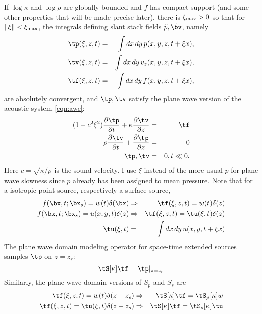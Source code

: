 If $\log \kappa$ and $\log \rho$ are globally bounded and $f$ has
compact support (and some other properties that will be made precise
later), there is $\xi_{\rm max} > 0$ so that for
$\|\xi\|<\xi_{\rm max}$, the integrals defining slant stack fields
$\tilde{p},\tilde{\bv}$, namely
\begin{eqnarray}
\label{eqn:slant}
\tp(\xi,z,t)& = &\int dx\, dy\, p(x,y,z,t+\xi x),\nonumber\\
\tv(\xi,z,t)&=&\int dx\, dy\, v_z(x,y,z,t+\xi x),\nonumber\\
\tf(\xi,z,t)&=&\int dx\,dy\, f(x,y,z,t+\xi x),
\end{eqnarray}
are absolutely convergent, and $\tp, \tv$ satisfy the plane wave
version of the acoustic system \ref{eqn:awe}:
\begin{eqnarray}
\label{eqn:awepw}
(1-c^2\xi^2)\frac{\partial \tp}{\partial t} + \kappa\frac{\partial
  \tv}{\partial z} &=& \tf \nonumber\\
\rho \frac{\partial \tv}{\partial t} + \frac{\partial \tp}{\partial
  z}&=&0\nonumber\\
\tp,\tv&=&0, t \ll 0.
\end{eqnarray}
Here $c=\sqrt{\kappa/\rho}$ is the sound velocity. I use $\xi$ instead
of the more usual $p$ for plane wave slowness since $p$ already has
been assigned to mean pressure. Note that for a isotropic point
source, respectively a surface source,
\begin{eqnarray}
  f(\bx,t;\bx_s)=w(t)\delta(\bx) & \Rightarrow &
                                               \tf(\xi,z,t)=w(t)\delta(z)\\ \nonumber 
  f(\bx,t;\bx_s) = u(x,y,t)\delta(z) & \Rightarrow &
                                                     \tf(\xi,z,t) =
                                                     \tu(\xi,t)\delta(z)\\
  \nonumber
  \tu(\xi,t) &=& \int dx\,dy\, u(x,y,t+\xi x)
\end{eqnarray}
The plane wave domain modeling
operator for space-time extended sources samples $\tp$ on $z=z_r$:
\begin{equation}
\label{eqn:modpw}
\tS[\kappa]\tf = \tp|_{z=z_r}
\end{equation}
Similarly, the plane wave domain versions of $S_p$ and $S_s$ are
\begin{eqnarray}
  \label{eqn:pwpt}
 \tf(\xi,z,t) = w(t)\delta(z-z_s) & \Rightarrow & \tS[\kappa]\tf = \tS_p
  [\kappa]w\\ 
  \label{eqn:pwss}
\tf(\xi,z,t) = \tu(\xi,t)\delta(z-z_s) & \Rightarrow & \tS[\kappa]\tf =
  \tS_s[\kappa]\tu
\end{eqnarray}

